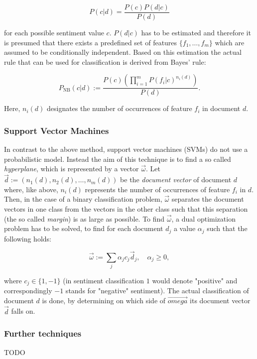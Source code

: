 \begin{equation*}
P(c \vert d) = \frac{P(c)P(d \vert c)}{P(d)}
\end{equation*}

for each possible sentiment value $c$. $P(d \vert c)$ has to be estimated and therefore it is presumed that there exists a predefined set of features $\lbrace f_1, \ldots , f_m \rbrace$ which are assumed to be conditionally independent. Based on this estimation the actual rule that can be used for classification is derived from Bayes' rule:

\begin{equation*}
P_{\mathrm{NB}}(c \vert d) := \frac{P(c)(\prod^{m}_{i=1}P(f_i \vert c)^{n_i(d)})}{P(d)}.
\end{equation*}

Here, $n_i(d)$ designates the number of occurrences of feature $f_i$ in document $d$.

\subsubsection*{Support Vector Machines}

In contrast to the above method, support vector machines (SVMs) do not use a probabilistic model. Instead the aim of this technique is to find a so called \emph{hyperplane}, which is represented by a vector $\vec{\omega}$. Let $\vec{d} := (n_1(d), n_2(d),\ldots , n_m(d))$ be the \emph{document vector} of document $d$ where, like above, $n_i(d)$ represents the number of occurrences of feature $f_i$ in $d$. Then, in the case of a binary classification problem, $\vec{\omega}$ separates the document vectors in one class from the vectors in the other class such that this separation (the so called \emph{margin}) is as large as possible. To find $\vec{\omega}$, a dual optimization problem has to be solved, to find for each document $d_j$ a value $\alpha_j$ such that the following holds:

\begin{equation*}
\vec{\omega} := \sum_j \alpha_j c_j \vec{d}_j,\quad \alpha_j \geq 0,
\end{equation*}

where $c_j \in \lbrace 1, -1\rbrace$ (in sentiment classification $1$ would denote "positive" and correspondingly $-1$ stands for "negative" sentiment). The actual classification of document $d$ is done, by determining on which side of $\vec{omega}$ its document vector $\vec{d}$ falls on.

\subsubsection*{Further techniques}

TODO